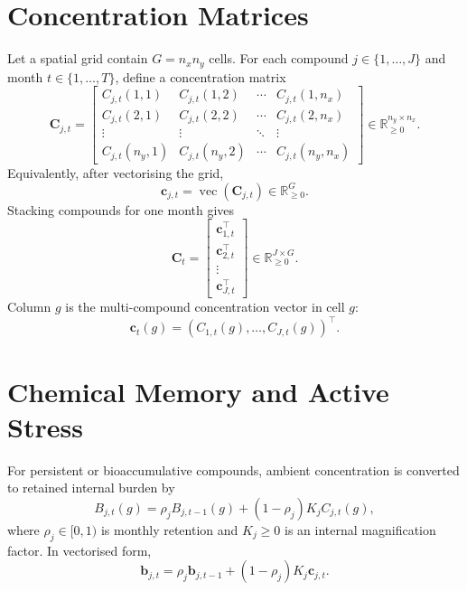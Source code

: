 \documentclass[11pt]{article}
\begin{document}
\section{Concentration Matrices}
Let a spatial grid contain $G=n_x n_y$ cells. For each compound $j\in\{1,\ldots,J\}$ and month
$t\in\{1,\ldots,T\}$, define a concentration matrix
\begin{equation}
\mathbf{C}_{j,t}
= \begin{bmatrix}
C_{j,t}(1,1) & C_{j,t}(1,2) & \cdots & C_{j,t}(1,n_x) \\
C_{j,t}(2,1) & C_{j,t}(2,2) & \cdots & C_{j,t}(2,n_x) \\
\vdots & \vdots & \ddots & \vdots \\
C_{j,t}(n_y,1) & C_{j,t}(n_y,2) & \cdots & C_{j,t}(n_y,n_x)
\end{bmatrix}
\in \mathbb{R}_{\ge 0}^{n_y\times n_x}.
\end{equation}
Equivalently, after vectorising the grid,
\begin{equation}
\bm{c}_{j,t}=\operatorname{vec}(\mathbf{C}_{j,t})\in\mathbb{R}_{\ge0}^{G}.
\end{equation}
Stacking compounds for one month gives
\begin{equation}
\mathbf{C}_{t}
=\begin{bmatrix}
\bm{c}_{1,t}^{\top}\\
\bm{c}_{2,t}^{\top}\\
\vdots\\
\bm{c}_{J,t}^{\top}
\end{bmatrix}
\in\mathbb{R}_{\ge0}^{J\times G}.
\end{equation}
Column $g$ is the multi-compound concentration vector in cell $g$:
\begin{equation}
\bm{c}_{t}(g)=\left(C_{1,t}(g),\ldots,C_{J,t}(g)\right)^{\top}.
\end{equation}

\section{Chemical Memory and Active Stress}
For persistent or bioaccumulative compounds, ambient concentration is converted to retained internal
burden by
\begin{equation}
B_{j,t}(g)=\rho_j B_{j,t-1}(g)+(1-\rho_j)K_j C_{j,t}(g),
\end{equation}
where $\rho_j\in[0,1)$ is monthly retention and $K_j\ge0$ is an internal magnification factor.
In vectorised form,
\begin{equation}
\bm{b}_{j,t}=\rho_j\bm{b}_{j,t-1}+(1-\rho_j)K_j\bm{c}_{j,t}.
\end{equation}
\end{document}
